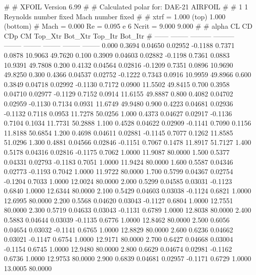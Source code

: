 #  
#       XFOIL         Version 6.99
#  
# Calculated polar for: DAE-21 AIRFOIL                                  
#  
# 1 1 Reynolds number fixed          Mach number fixed         
#  
# xtrf =   1.000 (top)        1.000 (bottom)  
# Mach =   0.000     Re =     0.095 e 6     Ncrit =   9.000  9.000
#  
#   alpha    CL        CD       CDp       CM     Top_Xtr  Bot_Xtr  Top_Itr  Bot_Itr
#  ------ -------- --------- --------- -------- -------- -------- -------- --------
   0.000   0.3694   0.04650   0.02952  -0.1188   0.7371   0.0878  10.9063  49.7620
   0.100   0.3909   0.04603   0.02882  -0.1198   0.7361   0.0883  10.9391  49.7808
   0.200   0.4132   0.04564   0.02816  -0.1209   0.7351   0.0896  10.9690  49.8250
   0.300   0.4366   0.04537   0.02752  -0.1222   0.7343   0.0916  10.9959  49.8966
   0.600   0.3849   0.04718   0.02992  -0.1130   0.7172   0.0900  11.5502  49.8415
   0.700   0.3958   0.04710   0.02977  -0.1129   0.7152   0.0914  11.6155  49.8887
   0.800   0.4082   0.04702   0.02959  -0.1130   0.7134   0.0931  11.6749  49.9480
   0.900   0.4223   0.04681   0.02936  -0.1132   0.7118   0.0953  11.7278  50.0256
   1.000   0.4373   0.04627   0.02917  -0.1136   0.7104   0.1034  11.7731  50.2888
   1.100   0.4528   0.04622   0.02909  -0.1141   0.7090   0.1156  11.8188  50.6854
   1.200   0.4698   0.04611   0.02881  -0.1145   0.7077   0.1262  11.8585  51.0296
   1.300   0.4881   0.04566   0.02846  -0.1151   0.7067   0.1478  11.8917  51.7127
   1.400   0.5178   0.04316   0.02816  -0.1175   0.7062   1.0000  11.9087  80.0000
   1.500   0.5377   0.04331   0.02793  -0.1183   0.7051   1.0000  11.9424  80.0000
   1.600   0.5587   0.04346   0.02773  -0.1193   0.7042   1.0000  11.9722  80.0000
   1.700   0.5799   0.04367   0.02754  -0.1204   0.7033   1.0000  12.0024  80.0000
   2.000   0.5299   0.04585   0.03031  -0.1123   0.6840   1.0000  12.6344  80.0000
   2.100   0.5429   0.04603   0.03038  -0.1124   0.6821   1.0000  12.6995  80.0000
   2.200   0.5568   0.04620   0.03043  -0.1127   0.6804   1.0000  12.7551  80.0000
   2.300   0.5719   0.04633   0.03043  -0.1131   0.6789   1.0000  12.8038  80.0000
   2.400   0.5883   0.04644   0.03039  -0.1135   0.6776   1.0000  12.8462  80.0000
   2.500   0.6056   0.04654   0.03032  -0.1141   0.6765   1.0000  12.8829  80.0000
   2.600   0.6236   0.04662   0.03021  -0.1147   0.6754   1.0000  12.9171  80.0000
   2.700   0.6427   0.04668   0.03004  -0.1154   0.6745   1.0000  12.9480  80.0000
   2.800   0.6629   0.04674   0.02981  -0.1162   0.6736   1.0000  12.9753  80.0000
   2.900   0.6839   0.04681   0.02957  -0.1171   0.6729   1.0000  13.0005  80.0000

